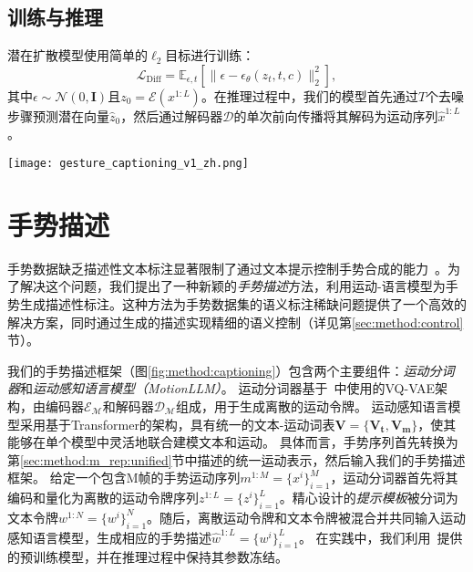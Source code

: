 \subsection{训练与推理}
潜在扩散模型使用简单的$\ell_2$目标进行训练\cite{ho2020ddpm, chen2023executing}：
\begin{equation}
  \mathcal{L}_{\text{Diff}} = \mathbb{E}_{\epsilon,t}[\|\epsilon - \epsilon_\theta(z_t, t, c)\|_2^2],
\end{equation}
其中$\epsilon \sim \mathcal{N}(0,\mathbf{I})$且$z_0 = \mathcal{E}(x^{1:L})$。在推理过程中，我们的模型首先通过$T$个去噪步骤预测潜在向量$\hat{z}_0$，然后通过解码器$\mathcal{D}$的单次前向传播将其解码为运动序列$\hat{x}^{1:L}$。

\begin{figure*}[t]
  \centering
  \texttt{[image: gesture\_captioning\_v1\_zh.png]}
  \caption{手势描述生成框架。我们的手势描述生成框架包含两个主要组件:
  运动分词器和运动感知语言模型。运动分词器将手势序列编码为离散的运动token序列,运动感知语
  言模型则基于这些token和提示模板生成对应的手势描述。}
  \label{fig:method:captioning}
\end{figure*}

\section{手势描述}
\label{sec:method:caption}
手势数据缺乏描述性文本标注显著限制了通过文本提示控制手势合成的能力~\cite{chen2024syntalker}。为了解决这个问题，我们提出了一种新颖的\textit{手势描述}方法，利用运动-语言模型为手势生成描述性标注。这种方法为手势数据集的语义标注稀缺问题提供了一个高效的解决方案，同时通过生成的描述实现精细的语义控制（详见第\ref{sec:method:control}节）。

我们的手势描述框架（图\ref{fig:method:captioning}）包含两个主要组件：\textit{运动分词器}和\textit{运动感知语言模型（MotionLLM）}。
运动分词器基于~\cite{}中使用的VQ-VAE架构，由编码器$\mathcal{E_M}$和解码器$\mathcal{D_M}$组成，用于生成离散的运动令牌。
运动感知语言模型采用基于Transformer的架构，具有统一的文本-运动词表$\mathbf{V} = \{\mathbf{V_t}, \mathbf{V_m}\}$，使其能够在单个模型中灵活地联合建模文本和运动。
具体而言，手势序列首先转换为第\ref{sec:method:m_rep:unified}节中描述的统一运动表示，然后输入我们的手势描述框架。
给定一个包含M帧的手势运动序列$m^{1:M}=\{x^i\}^M_{i=1}$，运动分词器首先将其编码和量化为离散的运动令牌序列$z^{1:L}=\{z^i\}^L_{i=1}$。精心设计的\textit{提示模板}被分词为文本令牌$w^{1:N}=\{w^i\}^N_{i=1}$。随后，离散运动令牌和文本令牌被混合并共同输入运动感知语言模型，生成相应的手势描述$\hat{w}^{1:L}=\{w^i\}^L_{i=1}$。
在实践中，我们利用~\cite{jiang2024motiongpt}提供的预训练模型，并在推理过程中保持其参数冻结。

